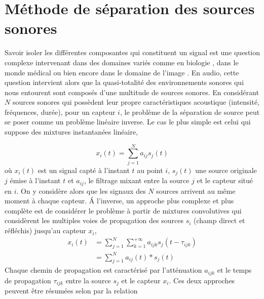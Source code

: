%
%
%
%
%

\chapter{Méthode de séparation des sources sonores}
\label{chap:methode_separation_source}


Savoir isoler les différentes composantes qui constituent un signal est une question complexe intervenant dans des domaines variés comme en biologie \cite{chiappetta2004blind}, dans le monde médical \cite{jung2000removing} ou bien encore dans le domaine de l'image \cite{nuzillard2000blind}. En audio, cette question intervient alors que la quasi-totalité des environnements sonores qui nous entourent sont composés d'une multitude de sources sonores. En considérant $N$ sources sonores qui possèdent leur propre caractéristiques acoustique (intensité, fréquences, durée), pour un capteur $i$, le problème de la séparation de source peut se poser comme un problème linéaire inverse. Le cas le plus simple est celui qui suppose des mixtures instantanées linéaire, 

\begin{equation}
x_i(t) = \sum_{j = 1}^{N} a_{ij}s_j(t)
\end{equation}
où $x_i(t)$ est un signal capté à l'instant $t$ au point $i$, $s_j(t)$ une source originale $j$ émise à l'instant $t$ et $a_{ij}$, le filtrage mixant entre la source $j$ et le capteur situé en $i$. On y considère alors que les signaux des $N$ sources arrivent au même moment à chaque capteur. \'A l'inverse, un approche plus complexe et plus complète est de considérer le problème à partir de mixtures convolutives qui considèrent les multiples voies de propagation des sources $s_i$ (champ direct et réfléchis) jusqu'au capteur $x_i$,  
\begin{subequations}
\begin{align}
x_i(t) &= \sum_{j = 1}^{N} \sum_{k = 1}^{+\infty} a_{ijk} s_j(t-\tau_{ijk})\\
 &= \sum_{j = 1}^{N} a_{ij}(t) \ast s_j(t)\label{eq:BSS_convol}
\end{align}
\end{subequations}
Chaque chemin de propagation est caractérisé par l'atténuation $a_{ijk}$ et le temps de propagation $\tau_{ijk}$ entre la source $s_j$ et le capteur $x_i$. Ces deux approches peuvent être résumées selon \cite{cardoso_blind_1998} par la relation  

